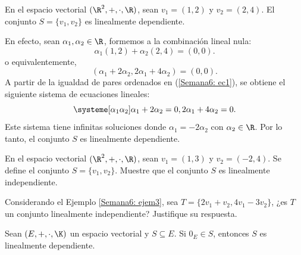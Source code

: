 \documentclass[compacto,10pt]{pubciencias-notas}
\begin{document}

\begin{ejem}\label{Semana6: ejem2}
En el espacio vectorial $(\R^{2},+,\cdot,\R)$, sean $v_{1} = (1,2)$ y $v_{2} = (2,4)$. El conjunto $S = \{v_{1}, v_{2}\}$ es linealmente dependiente. 

\noindent En efecto, sean $\alpha_1, \alpha_2\in\R$, formemos a la combinación lineal nula:
\[
    \alpha_1(1,2)+\alpha_2(2,4)=(0,0).
\]
o equivalentemente, 
\begin{equation}\label{Semana6: ec1}
    (\alpha_1+2\alpha_2,2\alpha_1+4\alpha_2)=(0,0).
\end{equation}
A partir de la igualdad de pares ordenados en (\ref{Semana6: ec1}), se obtiene el siguiente sistema de ecuaciones lineales:
\[
    \systeme[\alpha_{1} \alpha_{2}]{\alpha_1+2\alpha_2=0,2\alpha_1+4\alpha_2=0.}
\]
Este sistema tiene infinitas soluciones donde $\alpha_{1} = -2\alpha_{2}$ con $\alpha_{2}\in\R$. Por lo tanto, el conjunto $S$ es linealmente dependiente.
\end{ejem}

\begin{ejer}\label{Semana6: ejem3}
En el espacio vectorial $(\R^2,+,\cdot,\R)$, sean $v_{1} = (1, 3)$ y $v_{2} = (-2,4)$. Se define el conjunto $S = \{v_{1}, v_{2}\}$. Muestre que el conjunto $S$ es linealmente independiente.
\end{ejer}

\begin{ejer}\hspace{0pt}
Considerando el Ejemplo \ref{Semana6: ejem3}, sea $T=\{2v_{1} + v_{2}, 4v_{1} - 3v_{2}\}$, ¿es $T$ un conjunto linealmente independiente? Justifique su respuesta.
\end{ejer}

\begin{prop}
    Sean $(E,+,\cdot,\K)$ un espacio vectorial y $S\subseteq E$. Si $0_{E}\in S$, entonces $S$ es linealmente dependiente.
\end{prop}

\end{document}
